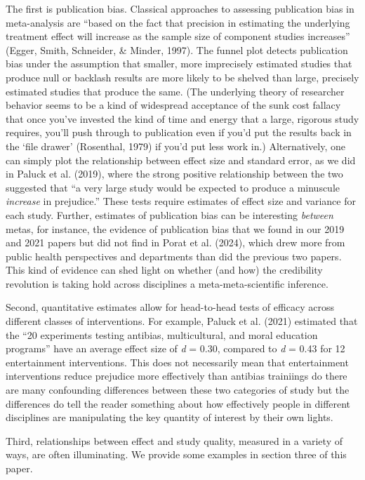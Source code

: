 \documentclass[
  man]{apa6}
\begin{document}
The first is publication bias. Classical approaches to assessing publication bias in meta-analysis are ``based on the fact that precision in estimating the underlying treatment effect will increase as the sample size of component studies increases'' (Egger, Smith, Schneider, \& Minder, 1997). The funnel plot detects publication bias under the assumption that smaller, more imprecisely estimated studies that produce null or backlash results are more likely to be shelved than large, precisely estimated studies that produce the same. (The underlying theory of researcher behavior seems to be a kind of widespread acceptance of the sunk cost fallacy \textemdash that once you've invested the kind of time and energy that a large, rigorous study requires, you'll push through to publication even if you'd put the results back in the `file drawer' (Rosenthal, 1979) if you'd put less work in.) Alternatively, one can simply plot the relationship between effect size and standard error, as we did in Paluck et al. (2019), where the strong positive relationship between the two suggested that ``a very large study would be expected to produce a minuscule \emph{increase} in prejudice.'' These tests require estimates of effect size and variance for each study. Further, estimates of publication bias can be interesting \emph{between} metas, for instance, the evidence of publication bias that we found in our 2019 and 2021 papers but did not find in Porat et al. (2024), which drew more from public health perspectives and departments than did the previous two papers. This kind of evidence can shed light on whether (and how) the credibility revolution is taking hold across disciplines \textemdash a meta-meta-scientific inference.

Second, quantitative estimates allow for head-to-head tests of efficacy across different classes of interventions. For example, Paluck et al. (2021) estimated that the ``20 experiments testing antibias, multicultural, and moral education programs'' have an average effect size of \emph{d} = 0.30, compared to \emph{d} = 0.43 for 12 entertainment interventions. This does not necessarily mean that entertainment interventions reduce prejudice more effectively than antibias trainiings do \textemdash there are many confounding differences between these two categories of study \textemdash but the differences do tell the reader something about how effectively people in different disciplines are manipulating the key quantity of interest by their own lights.

Third, relationships between effect and study quality, measured in a variety of ways, are often illuminating. We provide some examples in section three of this paper.
\end{document}

